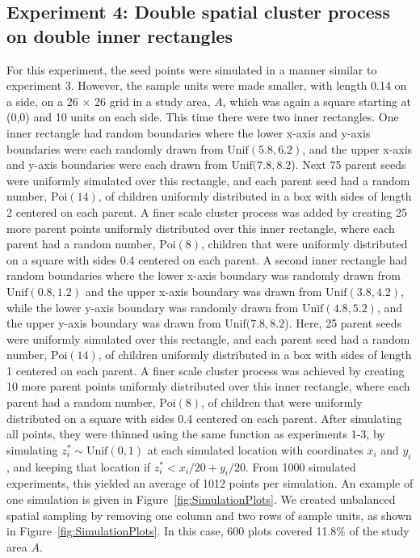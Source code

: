 \documentclass[12pt, titlepage]{article}\usepackage[]{graphicx}\usepackage[]{color}
\def\Poi{\textrm{Poi}}
\def\Unif{\textrm{Unif}}
\begin{document}

\subsection{Experiment 4: Double spatial cluster process on double inner rectangles} \label{sec:Exp4}

For this experiment, the seed points were simulated in a manner similar to experiment 3.  However, the sample units were made smaller, with length 0.14 on a side, on a 26 $\times$ 26 grid in a study area, $A$, which was again a square starting at (0,0) and 10 units on each side.  This time there were two inner rectangles. One inner rectangle had random boundaries where the lower x-axis and y-axis boundaries were each randomly drawn from $\Unif(5.8,6.2)$, and the upper x-axis and y-axis boundaries were each drawn from $\Unif(7.8,8.2$).  Next 75 parent seeds were uniformly simulated over this rectangle, and each parent seed had a random number, $\Poi(14)$, of children uniformly distributed in a box with sides of length 2 centered on each parent. A finer scale cluster process was added by creating 25 more parent points uniformly distributed over this inner rectangle, where each parent had a random number, $\Poi(8)$, children that were uniformly distributed on a square with sides 0.4 centered on each parent. A second inner rectangle had random boundaries where the lower x-axis boundary was randomly drawn from $\Unif(0.8,1.2)$ and the upper x-axis boundary was drawn from $\Unif(3.8,4.2)$, while the lower y-axis boundary was randomly drawn from $\Unif(4.8,5.2)$, and the upper y-axis boundary was drawn from $\Unif(7.8,8.2$).  Here, 25 parent seeds were uniformly simulated over this rectangle, and each parent seed had a random number, $\Poi(14)$, of children uniformly distributed in a box with sides of length 1 centered on each parent. A finer scale cluster process was achieved by creating 10 more parent points uniformly distributed over this inner rectangle, where each parent had a random number, $\Poi(8)$, of children that were uniformly distributed on a square with sides 0.4 centered on each parent. After simulating all points, they were thinned using the same function as experiments 1-3, by simulating $z^*_i \sim \Unif(0,1)$ at each simulated location with coordinates $x_i$ and $y_i$, and keeping that location if $z^*_i < x_i/20 + y_i/20$. From 1000 simulated experiments, this yielded an average of 1012 points per simulation. An example of one simulation is given in Figure~\ref{fig:SimulationPlots}. We created unbalanced spatial sampling by removing one column and two rows of sample units, as shown in Figure~\ref{fig:SimulationPlots}. In this case, 600 plots covered 11.8\% of the study area $A$.
\end{document}

